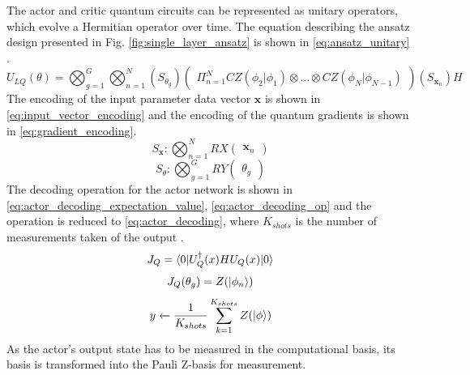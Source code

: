 The actor and critic quantum circuits can be represented as unitary operators, which evolve a Hermitian operator over time. 
The equation describing the ansatz design presented in Fig. \ref{fig:single_layer_ansatz} is shown in \ref{eq:ansatz_unitary} \cite{silvirianti_layerwise_2024}. 
\begin{equation} \label{eq:ansatz_unitary}
    U_{LQ} (\theta) = \bigotimes_{g=1}^{G} \bigotimes_{n=1}^{N} (S_{\theta_{g}}) \begin{pmatrix}
\Pi_{n=1}^{N} CZ(\phi_{2}|\phi_{1}) \otimes \dots \otimes CZ(\phi_{N}|\phi_{N-1})
\end{pmatrix} (S_{\textbf{x}_{n}})H
\end{equation}
The encoding of the input parameter data vector $\textbf{x}$ is shown in \ref{eq:input_vector_encoding} and the encoding of the quantum gradients is shown in \ref{eq:gradient_encoding}. 
\begin{equation} \label{eq:input_vector_encoding}
   S_{\textbf{x}}: \bigotimes_{n=1}^{N} RX \begin{pmatrix}
       \textbf{x}_{n}
   \end{pmatrix}
\end{equation}
\begin{equation} \label{eq:gradient_encoding}
   S_{\theta} : \bigotimes_{g=1}^{G} RY \begin{pmatrix}
       \theta_g
   \end{pmatrix}
\end{equation}
The decoding operation for the actor network is shown in \ref{eq:actor_decoding_expectation_value}, \ref{eq:actor_decoding_op} and the operation is reduced to \ref{eq:actor_decoding}, where $K_{shots}$ is the number of measurements taken of the output \cite{silvirianti_layerwise_2024}. 
\begin{equation} \label{eq:actor_decoding_expectation_value}
   J_{Q} = \braket{0|U_{Q}^{\dagger}(x) H U_{Q}(x)|0}
\end{equation}
\begin{equation} \label{eq:actor_decoding_op}
   J_{Q} (\theta_{g}) = Z(\ket{\phi_{n}})
\end{equation}
\begin{equation} \label{eq:actor_decoding}
    y \xleftarrow[]{} \frac{1}{K_{shots}} \sum_{k=1}^{K_{shots}} Z(\ket{\phi})
\end{equation}
As the actor's output state has to be measured in the computational basis, its basis is transformed into the Pauli Z-basis for measurement. 

